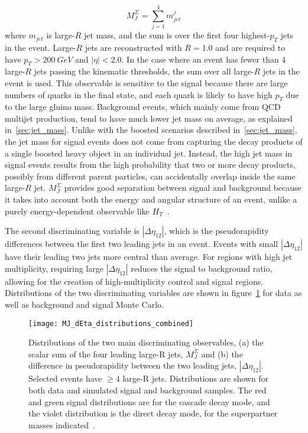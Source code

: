\begin{equation}
    M_{J}^{\Sigma} = \sum_{j=1}^{4}m_{jet}^j
\end{equation}
where $m_{jet}$ is large-$R$ jet mass, and the sum is over the first four highest-$p_{T}$ jets in the event.
Large-$R$ jets are reconstructed with $R=1.0$ and are required to have $p_{T}>200~GeV$ and $|\eta|<2.0$.
In the case where an event has fewer than 4 large-$R$ jets passing the kinematic thresholds, the sum over all large-$R$ jets in the event is used.
This observable is sensitive to the signal because there are large numbers of quarks in the final state, and each quark is likely to have high $p_{T}$ due to the large gluino mass.
Background events, which mainly come from QCD multijet production, tend to have much lower jet mass on average, as explained in~\ref{sec:jet_mass}.
Unlike with the boosted scenarios described in~\ref{sec:jet_mass}, the jet mass for signal events does not come from capturing the decay products of a single boosted heavy object in an individual jet.
Instead, the high jet mass in signal events results from the high probability that two or more decay products, possibly from different parent particles, can accidentally overlap inside the same large-$R$ jet.
$M_{J}^{\Sigma}$ provides good separation between signal and background because it takes into account both the energy and angular structure of an event, unlike a purely energy-dependent observable like $H_{T}$~\cite{hook-mj,elhedri-mj}.

The second discriminating variable is $|\Delta \eta_{12}|$, which is the pseudorapidity differences between the first two leading jets in an event.
Events with small $|\Delta \eta_{12}|$ have their leading two jets more central than average.
For regions with high jet multiplicity, requiring large $|\Delta \eta_{12}|$ reduces the signal to background ratio, allowing for the creation of high-multiplicity control and signal regions.
Distributions of the two discriminating variables are shown in figure~\ref{fig:MJ_dEta_distributions} for data as well as background and signal Monte Carlo.

\begin{figure}[!ht]
    \centering
    \texttt{[image: MJ\_dEta\_distributions\_combined]}
    \caption{Distributions of the two main discriminating observables, (a) the scalar sum of the four leading large-R jets, $M_{J}^{\Sigma}$ and (b) the difference in pseudorapidity between the two leading jets, $|\Delta\eta_{12}|$.
    Selected events have $\geq 4$ large-R jets.
    Distributions are shown for both data and simulated signal and background samples.
    The red and green signal distributions are for the cascade decay mode, and the violet distribution is the direct decay mode, for the superpartner masses indicated~\cite{paper-plb}.}
    \label{fig:MJ_dEta_distributions}
\end{figure}

